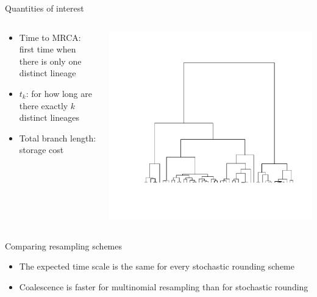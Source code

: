 \documentclass[aspectratio=169]{beamer}
\theoremstyle{definition}
\begin{document}
\begin{frame}{Quantities of interest}
\begin{columns}
\begin{column}{0.45\textwidth}
\begin{itemize}%
\item Time to MRCA: first time when there is only one distinct lineage
\item $t_k$: for how long are there exactly $k$ distinct lineages
\item Total branch length: storage cost
\end{itemize}
\end{column}
\begin{column}{0.45\textwidth}
\includegraphics[width=\textwidth, trim={2.8cm 3cm 1.5cm 2cm}, clip]{ncoalescent.pdf}
\end{column}
\end{columns}
\end{frame}


\begin{frame}{Comparing resampling schemes}
\begin{itemize}
\item The expected time scale is the same for every stochastic rounding scheme
\item Coalescence is faster for multinomial resampling than for stochastic rounding
\end{itemize}
\end{frame}
\end{document}
